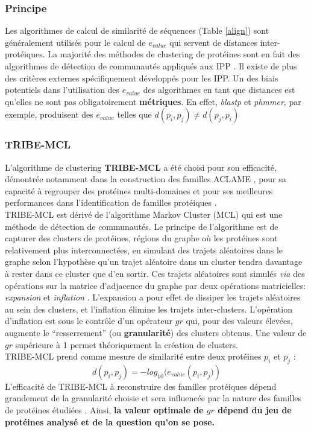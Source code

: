 \subsubsection{Principe}    
     Les algorithmes de calcul de similarité de séquences (Table \ref{align}) sont généralement utilisés pour le calcul de $e_{value}$ qui servent de distances inter-protéiques. La majorité des méthodes de clustering de protéines sont en fait des algorithmes de détection de communautés appliqués aux IPP \citep{Brohee2006,li2010computational}. Il existe de plus des critères externes spécifiquement développés pour les IPP. Un des biais potentiels dans l'utilisation des $e_{value}$ des algorithmes en tant que distances est qu'elles ne sont pas obligatoirement \textbf{métriques}. En effet, \textit{blastp} et \textit{phmmer}, par exemple, produisent des $e_{value}$ telles que $d(p_{i},p_{j}) \neq d(p_{j},p_{i})$\\
 
 
\subsubsection{TRIBE-MCL}
	L'algorithme de clustering \textbf{TRIBE-MCL} \citep{Enright2002} a été choisi pour son efficacité, démontrée notamment dans la construction des familles ACLAME \citep{leplae2010aclame}, pour sa capacité à regrouper des protéines multi-domaines \citep{Enright2002,Frech2010} et pour ses meilleures performances dans l'identification de familles protéiques \citep{Frech2010,apeltsin2011improving}. \\
	TRIBE-MCL est dérivé de l'algorithme Markov Cluster (MCL) \citep{van2000graph} qui est une méthode de détection de communautés. Le principe de l'algorithme est de capturer des clusters de protéines, régions du graphe où les protéines sont relativement plus interconnectées, en simulant des trajets aléatoires dans le graphe selon l'hypothèse qu'un trajet aléatoire dans un cluster tendra davantage à rester dans ce cluster que d'en sortir. Ces trajets aléatoires sont simulés \textit{via} des opérations sur la matrice d'adjacence du graphe par deux opérations matricielles: \textit{expansion} et \textit{inflation} \citep{Enright2002}. L'expansion a pour effet de dissiper les trajets aléatoires au sein des clusters, et l'inflation élimine les trajets inter-clusters. L'opération d'inflation est sous le contrôle d'un opérateur $gr$ qui, pour des valeurs élevées, augmente le “resserrement” (ou \textbf{granularité}) des clusters obtenus. Une valeur de $gr$ supérieure à 1 permet théoriquement la création de clusters. \\
TRIBE-MCL prend comme mesure de similarité entre deux protéines $p_{i}$ et $p_{j}$ :
	\begin{equation}
		d(p_{i},p_{j})=-log_{10}(e_{value}({p_{i},p_{j})})
	\end{equation}
	L'efficacité de TRIBE-MCL à reconstruire des familles protéiques dépend grandement de la granularité choisie et sera influencée par la nature des familles de protéines étudiées \citep{Frech2010,apeltsin2011improving}.  Ainsi, \textbf{la valeur optimale de $gr$ dépend du jeu de protéines analysé et de la question qu'on se pose.} 


